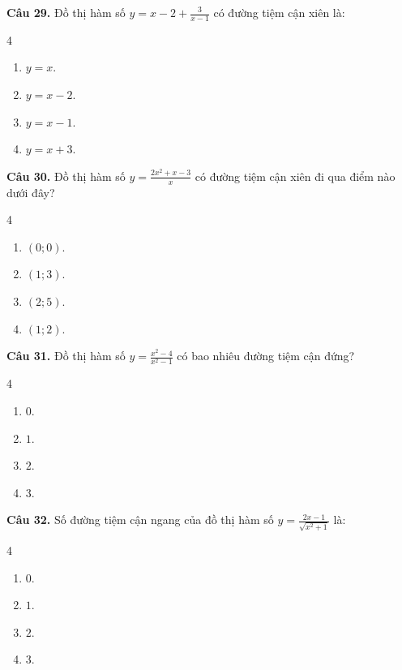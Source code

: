 \documentclass[12pt]{article}
\begin{document}
	\vspace{0.4cm}
	\noindent \textbf{Câu 29.} Đồ thị hàm số $y = x - 2 + \frac{3}{x - 1}$ có đường tiệm cận xiên là:
	\begin{multicols}{4}
		\begin{enumerate}[label=\textbf{\Alph*.}]
			\item $y = x$.
			\item $y = x - 2$.
			\item $y = x - 1$.
			\item $y = x + 3$.
		\end{enumerate}
	\end{multicols}
	
	\vspace{0.4cm}
	\noindent \textbf{Câu 30.} Đồ thị hàm số $y = \frac{2x^2 + x - 3}{x}$ có đường tiệm cận xiên đi qua điểm nào dưới đây?
	\begin{multicols}{4}
		\begin{enumerate}[label=\textbf{\Alph*.}]
			\item $(0; 0)$.
			\item $(1; 3)$.
			\item $(2; 5)$.
			\item $(1; 2)$.
		\end{enumerate}
	\end{multicols}
	
	\vspace{0.4cm}
	\noindent \textbf{Câu 31.} Đồ thị hàm số $y = \frac{x^2 - 4}{x^2 - 1}$ có bao nhiêu đường tiệm cận đứng?
	\begin{multicols}{4}
		\begin{enumerate}[label=\textbf{\Alph*.}]
			\item $0$.
			\item $1$.
			\item $2$.
			\item $3$.
		\end{enumerate}
	\end{multicols}
	
	\vspace{0.4cm}
	\noindent \textbf{Câu 32.} Số đường tiệm cận ngang của đồ thị hàm số $y = \frac{2x - 1}{\sqrt{x^2 + 1}}$ là:
	\begin{multicols}{4}
		\begin{enumerate}[label=\textbf{\Alph*.}]
			\item $0$.
			\item $1$.
			\item $2$.
			\item $3$.
		\end{enumerate}
	\end{multicols}
	
\end{document}
